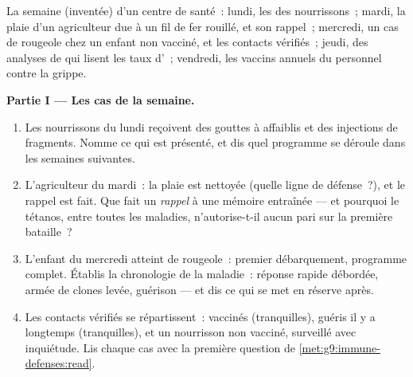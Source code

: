 \begin{problem}\label{pb:g9:immune-defenses:1}
La semaine (inventée) d'un centre de santé~: lundi, les
 des nourrissons~; mardi, la plaie d'un
agriculteur due à un fil de fer rouillé, et son rappel~;
mercredi, un cas de rougeole chez un enfant non vacciné, et
les contacts vérifiés~; jeudi, des analyses de  qui
lisent les taux d'~; vendredi, les vaccins annuels
du personnel contre la grippe.

\medskip\noindent\textbf{Partie I --- Les cas de la semaine.}
\begin{enumerate}
  \item Les nourrissons du lundi reçoivent des gouttes à
         affaiblis et des injections de fragments.
        Nomme ce qui est présenté, et dis quel programme se
        déroule dans les semaines suivantes.
  \item L'agriculteur du mardi~: la plaie est nettoyée
        (quelle ligne de défense~?), et le rappel est fait.
        Que fait un \emph{rappel} à une mémoire entraînée
        --- et pourquoi le tétanos, entre toutes les
        maladies, n'autorise-t-il aucun pari sur la première
        bataille~?
  \item L'enfant du mercredi atteint de rougeole~: premier
        débarquement, programme complet. Établis la
        chronologie de la maladie~: réponse rapide débordée,
        armée de clones levée, guérison --- et dis ce qui se
        met en réserve après.
  \item Les contacts vérifiés se répartissent~: vaccinés
        (tranquilles), guéris il y a longtemps (tranquilles),
        et un nourrisson non vacciné, surveillé avec
        inquiétude. Lis chaque cas avec la première question
        de \cref{met:g9:immune-defenses:read}.
\end{enumerate}


\end{problem}
